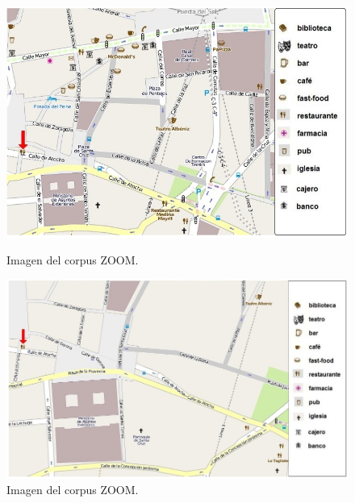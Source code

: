 \begin{figure}
\begin{minipage}[b]{0.48\linewidth}
\centering
\includegraphics[width=\textwidth]{images/corpus/mapa7.png}
\caption{Imagen del corpus ZOOM.}
\label{mapa9}
\end{minipage}
\hspace*{0cm}
\begin{minipage}[b]{0.55\linewidth}
\centering
\includegraphics[width=\textwidth]{images/corpus/mapa17.png}
\caption{Imagen del corpus ZOOM.}
\label{mapa10}
\end{minipage}
\end{figure}

